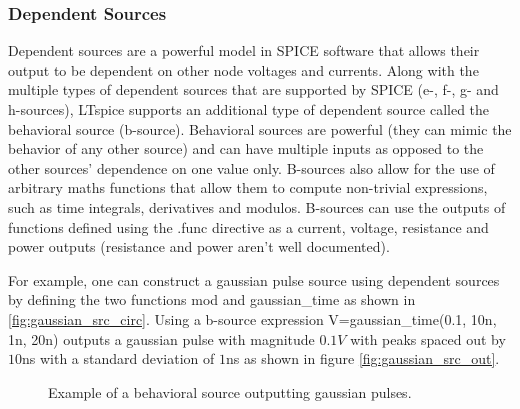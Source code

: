 \documentclass[]{article}
\newcommand{\cf}[1]{\textsf{#1}}
\begin{document}
\subsubsection{Dependent Sources}

Dependent sources are a powerful model in SPICE software that allows their output to be
dependent on other node voltages and currents. Along with the multiple types
of dependent sources that are supported by SPICE (e-, f-, g- and h-sources), LTspice
supports an additional type of dependent source called the behavioral source (b-source).
Behavioral sources are powerful (they can mimic the behavior of any other source) and
can have multiple inputs as opposed to the other sources' dependence on one value only.
B-sources also allow for the use of arbitrary maths functions that allow them to compute
non-trivial expressions, such as time integrals, derivatives and modulos.
B-sources can use the outputs of functions defined using the \cf{.func} directive
as a current, voltage, resistance and power outputs (resistance and power aren't well 
documented). 

For example, one can construct a gaussian pulse source using dependent sources
by defining the two functions \cf{mod} and \cf{gaussian\_time} as shown in 
\ref{fig:gaussian_src_circ}.
Using a b-source expression \cf{V=gaussian\_time(0.1, 10n, 1n, 20n)}
outputs a gaussian pulse with magnitude $0.1V$ with peaks
spaced out by $10$ns with a standard deviation of $1$ns as shown in figure
\ref{fig:gaussian_src_out}. 

\begin{figure}
    \centering
    \caption{Example of a behavioral source outputting gaussian pulses.}
\end{figure}
\end{document}
